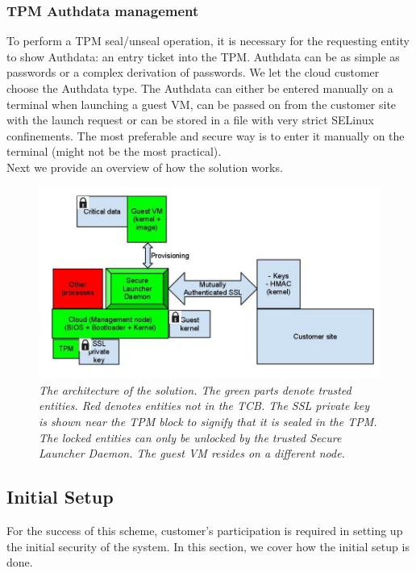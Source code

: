\documentclass[10pt,twocolumn,pdftex]{article}
\begin{document}
\subsubsection{TPM Authdata management}
To perform a TPM seal/unseal operation, it is necessary for the requesting entity to show Authdata: an entry ticket into the TPM. Authdata can be as simple as passwords or a complex derivation of passwords. We let the cloud customer choose the Authdata type. The Authdata can either be entered manually on a terminal when launching a guest VM, can be passed on from the customer site with the launch request or can be stored in a file with very strict SELinux confinements. The most preferable and secure way is to enter it manually on the terminal (might not be the most practical). 
\\

Next we provide an overview of how the solution works.

\begin{figure}[htp]
\centering
\includegraphics[scale=0.50]{csc574-solution.jpg}
\caption{\small \sl The architecture of the solution. The green parts denote trusted entities. Red denotes entities not in the TCB. The SSL private key is shown near the TPM block to signify that it is sealed in the TPM. The locked entities can only be unlocked by the trusted Secure Launcher Daemon. The guest VM resides on a different node. }
\label{fig:solution}
\end{figure}
\subsection{Initial Setup}
For the success of this scheme, customer's participation is required in setting up the initial security of the system. In this section, we cover how the initial setup is done.
\end{document}
